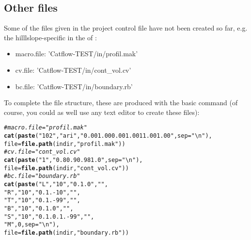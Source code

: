 \documentclass[article,nojss]{jss}\usepackage[]{graphicx}\usepackage[]{xcolor}
\makeatletter
\newcommand{\hlnum}[1]{\textcolor[rgb]{0.686,0.059,0.569}{#1}}%
\newcommand{\hlsng}[1]{\textcolor[rgb]{0.192,0.494,0.8}{#1}}%
\newcommand{\hlcom}[1]{\textcolor[rgb]{0.678,0.584,0.686}{\textit{#1}}}%
\newcommand{\hldef}[1]{\textcolor[rgb]{0.345,0.345,0.345}{#1}}%
\newcommand{\hlkwc}[1]{\textcolor[rgb]{0.333,0.667,0.333}{#1}}%
\newcommand{\hlkwd}[1]{\textcolor[rgb]{0.737,0.353,0.396}{\textbf{#1}}}%
\newenvironment{kframe}{%
 \def\at@end@of@kframe{}%
 \ifinner\ifhmode%
  \def\at@end@of@kframe{\end{minipage}}%
  \begin{minipage}{\columnwidth}%
 \fi\fi%
 \def\FrameCommand##1{\hskip\@totalleftmargin \hskip-\fboxsep
 \colorbox{shadecolor}{##1}\hskip-\fboxsep
     \hskip-\linewidth \hskip-\@totalleftmargin \hskip\columnwidth}%
 \MakeFramed {\advance\hsize-\width
   \@totalleftmargin\z@ \linewidth\hsize
   \@setminipage}}%
 {\par\unskip\endMakeFramed%
 \at@end@of@kframe}
\newenvironment{knitrout}{}{} %
\makeatother
\begin{document}
\subsection{Other files}\label{sec:otherFiles}

Some of the files given in the project control file have not been created so far,
e.g. the hilllslope-specific in the  of :
\begin{itemize} 
\item macro.file:  'Catflow-TEST/in/profil.mak'
\item cv.file:  'Catflow-TEST/in/cont\_vol.cv'
\item bc.file:  'Catflow-TEST/in/boundary.rb'
\end{itemize} 
 
To complete the file structure, these are produced with the basic  command (of course, you could as well use any text editor to create these files):
 
\begin{knitrout}
\color{fgcolor}\begin{kframe}
\begin{alltt}
\hlcom{# macro.file = "profil.mak"}
 \hlkwd{cat}\hldef{(}\hlkwd{paste}\hldef{(}\hlsng{"1  0  2"}\hldef{,} \hlsng{"ari"}\hldef{,} \hlsng{"0.00 1.00 0.00 1.00 1  1.00 1.00 "}\hldef{,} \hlkwc{sep}\hldef{=}\hlsng{"\textbackslash{}n"}\hldef{),}
   \hlkwc{file} \hldef{=} \hlkwd{file.path}\hldef{(indir,} \hlsng{"profil.mak"}\hldef{)  )}
\hlcom{# cv.file = "cont_vol.cv" }
 \hlkwd{cat}\hldef{(}\hlkwd{paste}\hldef{(}\hlsng{"1"}\hldef{,} \hlsng{"0.8   0.9   0.98   1.0"}\hldef{,}\hlkwc{sep}\hldef{=}\hlsng{"\textbackslash{}n"}\hldef{),}
   \hlkwc{file} \hldef{=} \hlkwd{file.path}\hldef{(indir,} \hlsng{"cont_vol.cv"}\hldef{)  )}
\hlcom{# bc.file = "boundary.rb"}
 \hlkwd{cat}\hldef{(}\hlkwd{paste}\hldef{(}\hlsng{"L"}\hldef{,} \hlsng{"1  0"}\hldef{,} \hlsng{"0. 1. 0"}\hldef{,}   \hlsng{" "}\hldef{,}
           \hlsng{"R"}\hldef{,} \hlsng{"1  0"}\hldef{,} \hlsng{"0. 1. -10"}\hldef{,} \hlsng{" "}\hldef{,}
           \hlsng{"T"}\hldef{,} \hlsng{"1  0"}\hldef{,} \hlsng{"0. 1. -99 "}\hldef{,}\hlsng{" "}\hldef{,}
           \hlsng{"B"}\hldef{,} \hlsng{"1  0"}\hldef{,} \hlsng{"0. 1. 0"}\hldef{,}   \hlsng{" "}\hldef{,}
           \hlsng{"S"}\hldef{,} \hlsng{"1  0"}\hldef{,} \hlsng{"0. 1. 0. 1. -99"}\hldef{,}   \hlsng{" "}\hldef{,}
           \hlsng{"M"}\hldef{,} \hlnum{0} \hldef{,} \hlkwc{sep}\hldef{=}\hlsng{"\textbackslash{}n"}\hldef{),}
   \hlkwc{file} \hldef{=} \hlkwd{file.path}\hldef{(indir,} \hlsng{"boundary.rb"}\hldef{)  )}
\end{alltt}
\end{kframe}
\end{knitrout}
\end{document}
